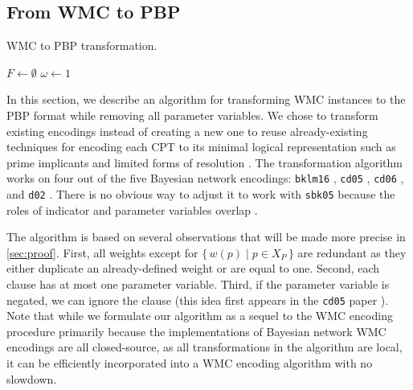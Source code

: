 \subsection{From WMC to PBP}

\begin{algorithm}[t]
  \caption{WMC to PBP transformation.}\label{alg:transformation}
  $F \gets \emptyset$\;
  $\omega \gets 1$\;
\end{algorithm}

In this section, we describe an algorithm for transforming WMC instances to the
PBP format while removing all parameter variables. We chose to transform
existing encodings instead of creating a new one to reuse already-existing
techniques for encoding each CPT to its minimal logical representation such as
prime implicants and limited forms of resolution
\citep{DBLP:conf/ecai/BartKLM16,DBLP:conf/ijcai/ChaviraD05,DBLP:conf/sat/ChaviraD06}.
The transformation algorithm works on four out of the five Bayesian network
encodings: \texttt{bklm16} \citep{DBLP:conf/ecai/BartKLM16}, \texttt{cd05}
\citep{DBLP:conf/ijcai/ChaviraD05}, \texttt{cd06}
\citep{DBLP:conf/sat/ChaviraD06}, and \texttt{d02}
\citep{DBLP:conf/kr/Darwiche02}. There is no obvious way to adjust it to work
with \texttt{sbk05} because the roles of indicator and parameter variables
overlap \citep{DBLP:conf/aaai/SangBK05}.

The algorithm is based on several observations that will be made more precise in
\cref{sec:proof}. First, all weights except for $\{\, w(p) \mid p \in X_P \,\}$
are redundant as they either duplicate an already-defined weight or are equal to
one. Second, each clause has at most one parameter variable. Third, if the
parameter variable is negated, we can ignore the clause (this idea first appears
in the \texttt{cd05} paper \citep{DBLP:conf/ijcai/ChaviraD05}). Note that while
we formulate our algorithm as a sequel to the WMC encoding procedure primarily
because the implementations of Bayesian network WMC encodings are all
closed-source, as all transformations in the algorithm are local, it can be
efficiently incorporated into a WMC encoding algorithm with no slowdown.

